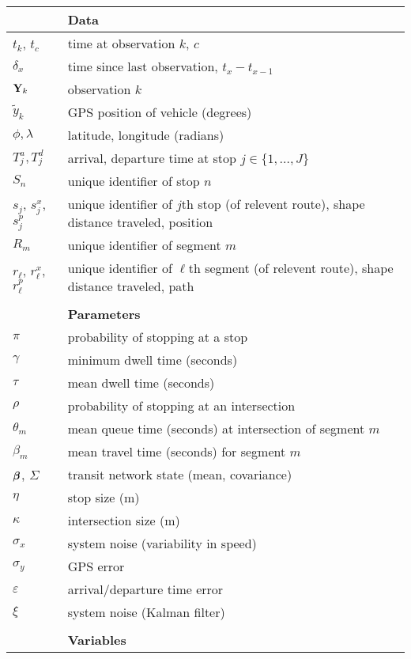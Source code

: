 \documentclass[draftcls,a4paper,onecolumn]{IEEEtran}\usepackage[]{graphicx}\usepackage[]{color}
\begin{document}
\begin{xtabular}{ll}
  \toprule
  &\textbf{Data} \\ \midrule
  $t_k$, $t_c$ & time at observation $k$, $c$ \\
  $\delta_x$ & time since last observation, $t_x - t_{x-1}$\\
  $\mathbf{Y}_k$ & observation $k$ \\
  $\tilde y_k$ & GPS position of vehicle (degrees) \\
  $\phi,\lambda$ & latitude, longitude (radians) \\
  $T^a_j, T^d_j$ & arrival, departure time at stop $j \in \{1, \ldots, J\}$ \\
  $S_n$ & unique identifier of stop $n$ \\
  $s_j$, $s_j^x$, $s_j^p$ & unique identifier of $j$th stop (of relevent route), shape distance traveled, position \\
  $R_m$ & unique identifier of segment $m$  \\
  $r_\ell$, $r_\ell^x$, $r_\ell^p$ & unique identifier of $\ell$th segment (of relevent route), shape distance traveled, path \\
  \bottomrule
  \\ \toprule
  &\textbf{Parameters} \\ \midrule
  $\pi$ & probability of stopping at a stop \\
  $\gamma$ & minimum dwell time (seconds) \\
  $\tau$ & mean dwell time (seconds) \\
  $\rho$ & probability of stopping at an intersection \\
  $\theta_m$ & mean queue time (seconds) at intersection of segment $m$ \\
  $\beta_m$ & mean travel time (seconds) for segment $m$ \\
  $\boldsymbol{\beta}$, $\Sigma$ & transit network state (mean, covariance) \\
  $\eta$ & stop size (m) \\
  $\kappa$ & intersection size (m) \\
  $\sigma_x$ & system noise (variability in speed) \\
  $\sigma_y$ & GPS error \\
  $\varepsilon$ & arrival/departure time error \\
  $\xi$ & system noise (Kalman filter) \\
  \bottomrule
  \\ \toprule
  &\textbf{Variables} \\ \midrule

\end{xtabular}
\end{document}

